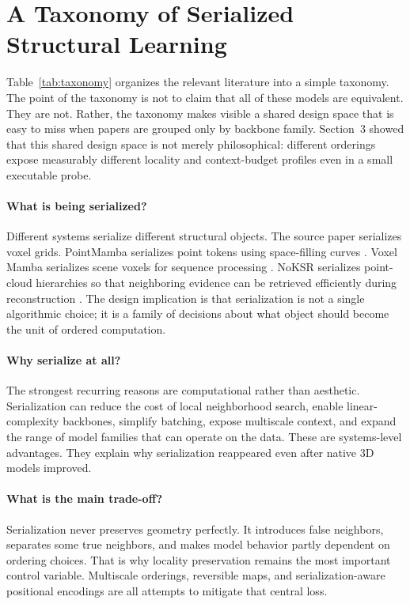 \section{A Taxonomy of Serialized Structural Learning}



Table~\ref{tab:taxonomy} organizes the relevant literature into a simple taxonomy. The point of the taxonomy is not to claim that all of these models are equivalent. They are not. Rather, the taxonomy makes visible a shared design space that is easy to miss when papers are grouped only by backbone family. Section~3 showed that this shared design space is not merely philosophical: different orderings expose measurably different locality and context-budget profiles even in a small executable probe.

\paragraph{What is being serialized?}
Different systems serialize different structural objects. The source paper serializes voxel grids. PointMamba serializes point tokens using space-filling curves \citep{liang2024pointmamba}. Voxel Mamba serializes scene voxels for sequence processing \citep{zhang2024voxelmamba}. NoKSR serializes point-cloud hierarchies so that neighboring evidence can be retrieved efficiently during reconstruction \citep{li2025noksr}. The design implication is that serialization is not a single algorithmic choice; it is a family of decisions about what object should become the unit of ordered computation.

\paragraph{Why serialize at all?}
The strongest recurring reasons are computational rather than aesthetic. Serialization can reduce the cost of local neighborhood search, enable linear-complexity backbones, simplify batching, expose multiscale context, and expand the range of model families that can operate on the data. These are systems-level advantages. They explain why serialization reappeared even after native 3D models improved.

\paragraph{What is the main trade-off?}
Serialization never preserves geometry perfectly. It introduces false neighbors, separates some true neighbors, and makes model behavior partly dependent on ordering choices. That is why locality preservation remains the most important control variable. Multiscale orderings, reversible maps, and serialization-aware positional encodings are all attempts to mitigate that central loss.

